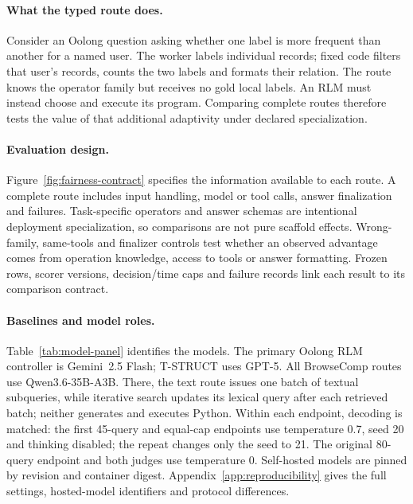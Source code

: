 \documentclass{article}
\begin{document}
\paragraph{What the typed route does.}
Consider an Oolong question asking whether one label is more frequent than another for a named user. The worker labels individual records; fixed code filters that user's records, counts the two labels and formats their relation. The route knows the operator family but receives no gold local labels. An RLM must instead choose and execute its program. Comparing complete routes therefore tests the value of that additional adaptivity under declared specialization.

\paragraph{Evaluation design.}
Figure~\ref{fig:fairness-contract} specifies the information available to each route. A complete route includes input handling, model or tool calls, answer finalization and failures. Task-specific operators and answer schemas are intentional deployment specialization, so comparisons are not pure scaffold effects. Wrong-family, same-tools and finalizer controls test whether an observed advantage comes from operation knowledge, access to tools or answer formatting. Frozen rows, scorer versions, decision/time caps and failure records link each result to its comparison contract.

\paragraph{Baselines and model roles.}
Table~\ref{tab:model-panel} identifies the models. The primary Oolong RLM controller is Gemini~2.5 Flash; T-STRUCT uses GPT-5. All BrowseComp routes use Qwen3.6-35B-A3B. There, the text route issues one batch of textual subqueries, while iterative search updates its lexical query after each retrieved batch; neither generates and executes Python. Within each endpoint, decoding is matched: the first 45-query and equal-cap endpoints use temperature 0.7, seed 20 and thinking disabled; the repeat changes only the seed to 21. The original 80-query endpoint and both judges use temperature 0. Self-hosted models are pinned by revision and container digest. Appendix~\ref{app:reproducibility} gives the full settings, hosted-model identifiers and protocol differences.
\end{document}
